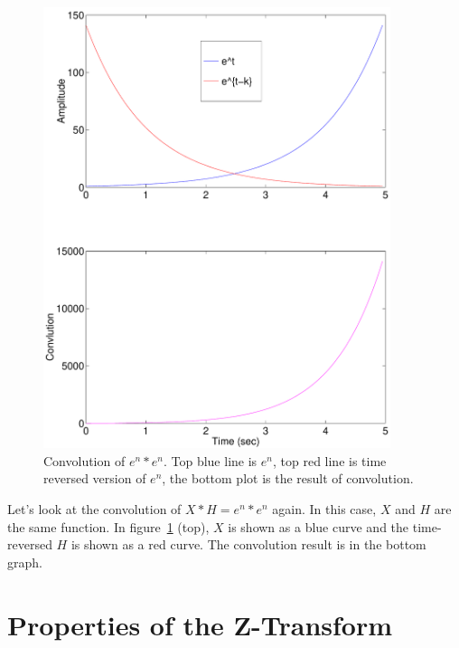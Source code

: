 \begin{figure}
\centerline{\includegraphics[width=4in]{ch-conv/zt_conv_etet}}
\caption[Convolution of $e^n \ast e^n$]{Convolution of $e^n \ast
  e^n$. Top blue line is $e^n$, top red line is time reversed version
  of $e^n$, the bottom plot is the result of convolution.
  \label{fig:zt-conv-etet}}
\end{figure}

Let's look at the convolution of $X \ast H =e^n \ast e^n$ again. In
this case, $X$ and $H$ are the same function. In
figure~\ref{fig:zt-conv-etet} (top), $X$ is shown as a blue curve and
the time-reversed $H$ is shown as a red curve. The convolution result
is in the bottom graph.


\section{Properties of the Z-Transform}

